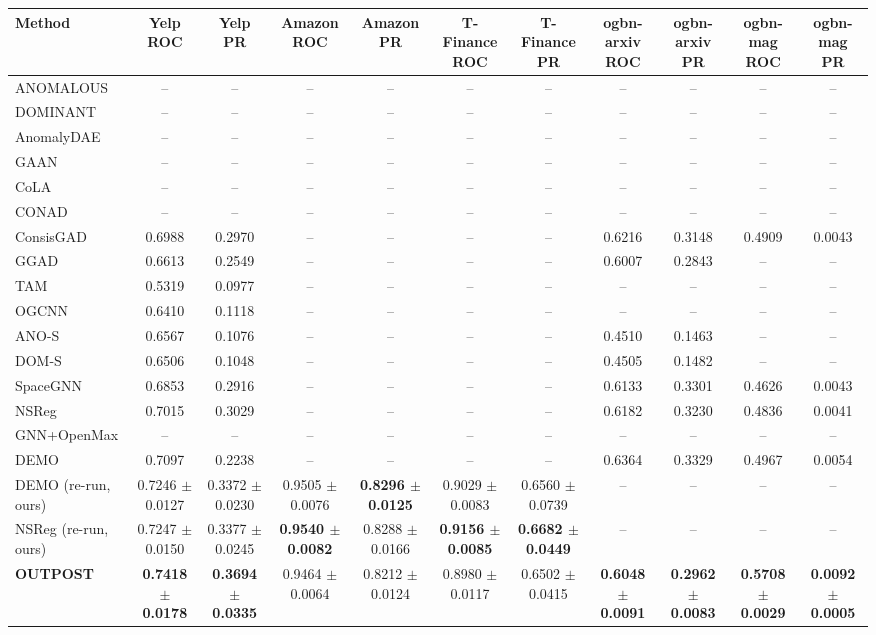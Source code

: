 \begin{table}[t]
\centering
\small
\begin{tabular}{lcccccccccc}
\toprule
Method & Yelp ROC & Yelp PR & Amazon ROC & Amazon PR & T-Finance ROC & T-Finance PR & ogbn-arxiv ROC & ogbn-arxiv PR & ogbn-mag ROC & ogbn-mag PR \\
\midrule
ANOMALOUS & -- & -- & -- & -- & -- & -- & -- & -- & -- & -- \\
DOMINANT & -- & -- & -- & -- & -- & -- & -- & -- & -- & -- \\
AnomalyDAE & -- & -- & -- & -- & -- & -- & -- & -- & -- & -- \\
GAAN & -- & -- & -- & -- & -- & -- & -- & -- & -- & -- \\
CoLA & -- & -- & -- & -- & -- & -- & -- & -- & -- & -- \\
CONAD & -- & -- & -- & -- & -- & -- & -- & -- & -- & -- \\
ConsisGAD & 0.6988 & 0.2970 & -- & -- & -- & -- & 0.6216 & 0.3148 & 0.4909 & 0.0043 \\
GGAD & 0.6613 & 0.2549 & -- & -- & -- & -- & 0.6007 & 0.2843 & -- & -- \\
TAM & 0.5319 & 0.0977 & -- & -- & -- & -- & -- & -- & -- & -- \\
OGCNN & 0.6410 & 0.1118 & -- & -- & -- & -- & -- & -- & -- & -- \\
ANO-S & 0.6567 & 0.1076 & -- & -- & -- & -- & 0.4510 & 0.1463 & -- & -- \\
DOM-S & 0.6506 & 0.1048 & -- & -- & -- & -- & 0.4505 & 0.1482 & -- & -- \\
SpaceGNN & 0.6853 & 0.2916 & -- & -- & -- & -- & 0.6133 & 0.3301 & 0.4626 & 0.0043 \\
NSReg & 0.7015 & 0.3029 & -- & -- & -- & -- & 0.6182 & 0.3230 & 0.4836 & 0.0041 \\
GNN+OpenMax & -- & -- & -- & -- & -- & -- & -- & -- & -- & -- \\
DEMO & 0.7097 & 0.2238 & -- & -- & -- & -- & 0.6364 & 0.3329 & 0.4967 & 0.0054 \\
DEMO (re-run, ours) & 0.7246 $\pm$ 0.0127 & 0.3372 $\pm$ 0.0230 & 0.9505 $\pm$ 0.0076 & \textbf{0.8296 $\pm$ 0.0125} & 0.9029 $\pm$ 0.0083 & 0.6560 $\pm$ 0.0739 & -- & -- & -- & -- \\
NSReg (re-run, ours) & 0.7247 $\pm$ 0.0150 & 0.3377 $\pm$ 0.0245 & \textbf{0.9540 $\pm$ 0.0082} & 0.8288 $\pm$ 0.0166 & \textbf{0.9156 $\pm$ 0.0085} & \textbf{0.6682 $\pm$ 0.0449} & -- & -- & -- & -- \\
\midrule
\textbf{OUTPOST} & \textbf{0.7418 $\pm$ 0.0178} & \textbf{0.3694 $\pm$ 0.0335} & 0.9464 $\pm$ 0.0064 & 0.8212 $\pm$ 0.0124 & 0.8980 $\pm$ 0.0117 & 0.6502 $\pm$ 0.0415 & \textbf{0.6048 $\pm$ 0.0091} & \textbf{0.2962 $\pm$ 0.0083} & \textbf{0.5708 $\pm$ 0.0029} & \textbf{0.0092 $\pm$ 0.0005} \\

\end{tabular}
\end{table}
